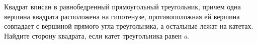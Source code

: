 \begin{ex}
	\begin{condition}
		Квадрат вписан в равнобедренный прямоугольный треугольник, причем одна вершина квадрата расположена на гипотенузе, противоположная ей вершина совпадает с вершиной прямого угла треугольника, а остальные лежат на катетах.	Найдите сторону квадрата, если катет треугольника равен \( a \).
	\end{condition}
\end{ex}